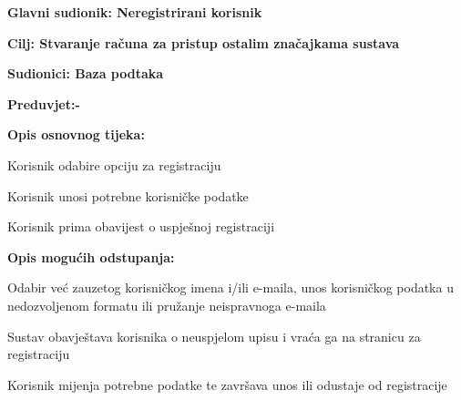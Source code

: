 \noindent {}
\begin{packed_item}

	\item \textbf{Glavni sudionik: Neregistrirani korisnik}
	\item  \textbf{Cilj: Stvaranje računa za pristup ostalim značajkama sustava}
	\item  \textbf{Sudionici: Baza podtaka}
	\item  \textbf{Preduvjet:-}
	\item  \textbf{Opis osnovnog tijeka:}

	\item[] \begin{packed_enum}

		\item Korisnik odabire opciju za registraciju
		\item Korisnik unosi potrebne korisničke podatke
		\item Korisnik prima obavijest o uspješnoj registraciji
	\end{packed_enum}

	\item  \textbf{Opis mogućih odstupanja:}

	\item[] \begin{packed_item}

		\item[2.a] Odabir već zauzetog korisničkog imena i/ili e-maila, unos korisničkog podatka u nedozvoljenom formatu ili pružanje neispravnoga e-maila
		\item[] \begin{packed_enum}

			\item  Sustav obavještava korisnika o neuspjelom upisu i vraća ga na stranicu za registraciju
			\item Korisnik mijenja potrebne podatke te završava unos ili odustaje od registracije

		\end{packed_enum}

	\end{packed_item}
\end{packed_item}


